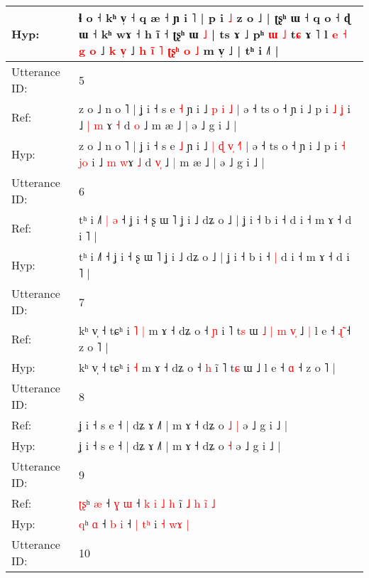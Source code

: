 \documentclass[10pt]{article}
\DeclareRobustCommand{\hl}[1]{{\textcolor{red}{#1}}}
\begin{document}
\begin{longtable}{ll}
 \\
Hyp: & ɬ o ˧ kʰ v̩ ˧ q æ ˧ ɲ i ˥ | p i \hl{˩} z o ˩ | ʈʂʰ ɯ ˧ q o ˧\hl{}\hl{} ɖ ɯ ˧ kʰ wɤ ˧ h ĩ ˧ ʈʂʰ ɯ \hl{˩} | ts ɤ ˩ pʰ \hl{}\hl{ɯ} \hl{˩} t\hl{ɕ} ɤ ˥ l \hl{e} \hl{˧} \hl{g}\hl{ }\hl{o} ˩ \hl{k} \hl{}\hl{v}\hl{̩} ˩ \hl{h} \hl{i}\hl{̃} \hl{˥} \hl{}\hl{ʈ}\hl{ʂ}\hl{ʰ} \hl{o} \hl{˩} m v̩ ˩ | tʰ i ˩˥ |
 \\
\midrule
Utterance ID: & 5 \\
Ref: & z o ˩ n o ˥ | ʝ i ˧ s e \hl{˧} ɲ i ˩\hl{}\hl{} \hl{p} \hl{}\hl{i} \hl{}\hl{˩} | ə ˧ ts o ˧ ɲ i ˩ p i \hl{˩} \hl{}\hl{ʝ} i ˩ \hl{|} \hl{m}\hl{ }ɤ \hl{˧} d \hl{}\hl{o} ˩\hl{}\hl{} m æ ˩ | ə ˩ g i ˩ |
 \\
Hyp: & z o ˩ n o ˥ | ʝ i ˧ s e \hl{˩} ɲ i ˩\hl{ }\hl{|} \hl{ɖ} \hl{v}\hl{̩} \hl{˧}\hl{˥} | ə ˧ ts o ˧ ɲ i ˩ p i \hl{˧} \hl{j}\hl{o} i ˩ \hl{m} \hl{}\hl{w}ɤ \hl{˩} d \hl{v}\hl{̩} ˩\hl{ }\hl{|} m æ ˩ | ə ˩ g i ˩ |
 \\
\midrule
Utterance ID: & 6 \\
Ref: & tʰ i ˩˥\hl{ }\hl{|}\hl{ }\hl{ə} ˧ ʝ i ˧ ʂ ɯ ˥ ʝ i ˩ dʑ o ˩ | ʝ i ˧ b i ˧\hl{}\hl{} d i ˧ m ɤ ˧ d i ˥ |
 \\
Hyp: & tʰ i ˩˥\hl{}\hl{}\hl{}\hl{} ˧ ʝ i ˧ ʂ ɯ ˥ ʝ i ˩ dʑ o ˩ | ʝ i ˧ b i ˧\hl{ }\hl{|} d i ˧ m ɤ ˧ d i ˥ |
 \\
\midrule
Utterance ID: & 7 \\
Ref: & kʰ v̩ ˧ tɕʰ i\hl{ }\hl{˥} \hl{|} m ɤ ˧ dʑ o ˧ \hl{ɲ} i\hl{} ˥ t\hl{s} ɯ\hl{ }\hl{˩}\hl{ }\hl{|}\hl{ }\hl{m}\hl{ }\hl{v}\hl{̩} ˩\hl{ }\hl{|} l e ˧ \hl{ɻ}\hl{̃} ˧ z o ˥ |
 \\
Hyp: & kʰ v̩ ˧ tɕʰ i\hl{}\hl{} \hl{˧} m ɤ ˧ dʑ o ˧ \hl{h} i\hl{̃} ˥ t\hl{ɕ} ɯ\hl{}\hl{}\hl{}\hl{}\hl{}\hl{}\hl{}\hl{}\hl{} ˩\hl{}\hl{} l e ˧ \hl{}\hl{ɑ} ˧ z o ˥ |
 \\
\midrule
Utterance ID: & 8 \\
Ref: & ʝ i ˧ s e ˧ | dʑ ɤ ˩˥ | m ɤ ˧ dʑ o\hl{ }\hl{˩} \hl{|} ə ˩ g i ˩ |
 \\
Hyp: & ʝ i ˧ s e ˧ | dʑ ɤ ˩˥ | m ɤ ˧ dʑ o\hl{}\hl{} \hl{˧} ə ˩ g i ˩ |
 \\
\midrule
Utterance ID: & 9 \\
Ref: & \hl{ʈ}\hl{ʂ}ʰ \hl{æ} ˧ \hl{ɣ} \hl{ɯ} ˧\hl{ }\hl{k} \hl{i} \hl{˩}\hl{ }\hl{h} i\hl{̃}\hl{ }\hl{˩} \hl{h} \hl{i}\hl{̃} \hl{˩}
 \\
Hyp: & \hl{}\hl{q}ʰ \hl{ɑ} ˧ \hl{b} \hl{i} ˧\hl{}\hl{} \hl{|} \hl{}\hl{t}\hl{ʰ} i\hl{}\hl{}\hl{} \hl{˧} \hl{w}\hl{ɤ} \hl{|}
 \\
\midrule
Utterance ID: & 10 \\

\end{longtable}
\end{document}
